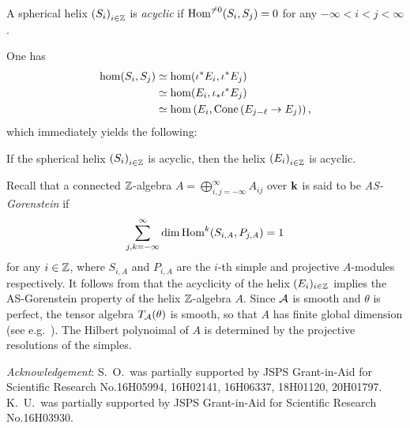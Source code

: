 \documentclass[a4paper,12pt]{amsart}
\begin{document}
\begin{definition}
A spherical helix
$\left( S_i \right)_{i \in \mathbb{Z}}$
is \emph{acyclic}
if
$
 \operatorname{Hom}^{\ne 0}(S_i, S_j) = 0
$
for any $-\infty < i < j < \infty$.
\end{definition}
One has
\begin{align}
\hom(S_i, S_j)
&\simeq \hom(\iota^* E_i, \iota^* E_j) \\
&\simeq \hom(E_i, \iota_* \iota^* E_j) \\
&\simeq \hom \left( E_i,
 \operatorname{Cone} \left( E_{j-\ell} \to E_j \right) \right),
\end{align}
which immediately yields the following:

\begin{theorem}
If the spherical helix
$\left( S_i \right)_{i \in \mathbb{Z}}$
is acyclic,
then
the helix
$\left( E_i \right)_{i \in \mathbb{Z}}$
is acyclic.
\end{theorem}

Recall that a connected $\mathbb{Z}$-algebra
$
A=\bigoplus_{i,j=-\infty}^\infty A_{ij}
$
over $\mathbf{k}$
is said to be
\emph{AS-Gorenstein}
if
\begin{align}
  \sum_{j,k=-\infty}^\infty
  \dim \operatorname{Hom}^k(S_{i,A}, P_{j,A})
  =1
\end{align}
for any $i \in \mathbb{Z}$,
where $S_{i,A}$ and $P_{i,A}$ are
the $i$-th simple and projective $A$-modules respectively.
It follows from 
that the acyclicity of the helix $(E_i)_{i \in \mathbb{Z}}$
implies the AS-Gorenstein property
of the helix $\mathbb{Z}$-algebra $A$.
Since $\mathcal{A}$ is smooth and $\theta$ is perfect,
the tensor algebra $T_{\mathcal{A}}(\theta)$ is smooth,
so that $A$ has finite global dimension
(see e.g.~\cite[Theorem 4.8]{MR2795754}).
The Hilbert polynoimal of $A$ is determined
by the projective resolutions of the simples.


\emph{Acknowledgement}:
S.~O.~was partially supported by
JSPS Grant-in-Aid for Scientific Research
No.16H05994, 16H02141, 16H06337, 18H01120, 20H01797. 
K.~U.~was partially supported by
JSPS Grant-in-Aid for Scientific Research
No.16H03930.



\end{document}
